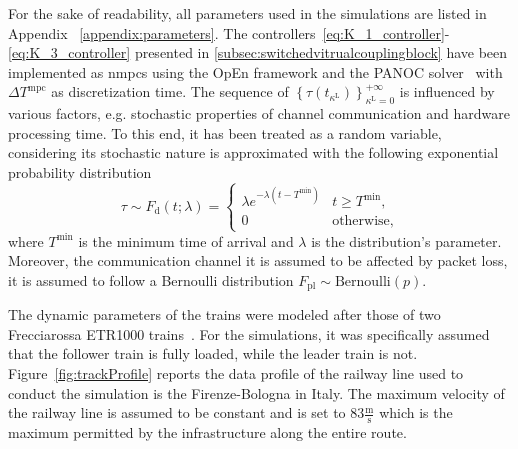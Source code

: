 \documentclass[letterpaper, 10 pt, conference]{ieeeconf}
\theoremstyle{definition}
\theoremstyle{nopoint}
\newcommand{\tildeAdd}{~}
\begin{document}
  
  For the sake of readability, all parameters used in the simulations are listed in Appendix \tildeAdd\ref{appendix:parameters}.   The controllers\tildeAdd\eqref{eq:K_1_controller}-\eqref{eq:K_3_controller} presented in \ref{subsec:switchedvitrualcouplingblock} have been implemented as \glspl{nmpc} using the OpEn framework and the PANOC solver\tildeAdd\cite{open2020} with $\Delta T^{\mathrm{mpc}}$ as discretization time. The sequence of $ \left\{ \tau(t_{\kappa^\mathrm{L}})\right\}_{\kappa^\mathrm{L}=0}^{+\infty}$ is influenced by various factors, e.g. stochastic properties of channel communication and hardware processing time. To this end, it has been treated as a random variable, considering its stochastic nature is  approximated with the following exponential probability distribution 
  \begin{equation} \label{eq:pdfDelay}
  	\tau \sim F_{\mathrm{d}} (t;\lambda) = \begin{cases}\lambda e^{-\lambda (t-T^{\min})} & t \geq T^{\min}, \\ 0 & \text{otherwise},\end{cases}
  \end{equation}
  where $T^\mathrm{min}$ is the minimum time of arrival and $\lambda$ is the distribution's parameter.
  Moreover, the communication channel it is assumed to be affected by packet loss, it is assumed to follow a Bernoulli distribution $F_{\mathrm{pl}} \sim \textrm{Bernoulli}(p)$.
  
  The dynamic parameters of the trains were modeled after those of two Frecciarossa ETR1000 trains\tildeAdd\cite{frecciarossa}. For the simulations, it was specifically assumed that the follower train is fully loaded, while the leader train is not. Figure\tildeAdd\ref{fig:trackProfile} reports the data profile of the railway line used to conduct the simulation is the Firenze-Bologna in Italy. The maximum velocity of the railway line is assumed to be constant and is set to $83\unit{\frac{\unit{\meter}}{\unit{\second}}}$ which is the maximum permitted by the infrastructure along the entire route.
  
\end{document}
